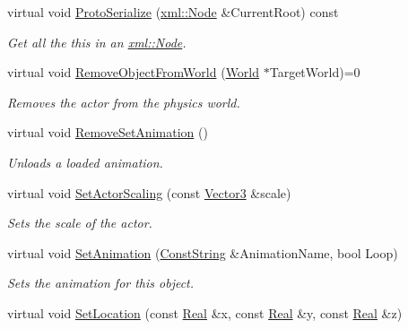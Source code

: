 \begin{DoxyCompactItemize}
virtual void \hyperlink{classphys_1_1ActorBase_a402b408b6ebb5ce82181a75dff14887f}{ProtoSerialize} (\hyperlink{classphys_1_1xml_1_1Node}{xml::Node} \&CurrentRoot) const 
\begin{DoxyCompactList}\small\item\em Get all the this in an \hyperlink{classphys_1_1xml_1_1Node}{xml::Node}. \item\end{DoxyCompactList}\item 
virtual void \hyperlink{classphys_1_1ActorBase_aaa787de7ec5d7d1d8428ea78f37bcb40}{RemoveObjectFromWorld} (\hyperlink{classphys_1_1World}{World} $\ast$TargetWorld)=0
\begin{DoxyCompactList}\small\item\em Removes the actor from the physics world. \item\end{DoxyCompactList}\item 
virtual void \hyperlink{classphys_1_1ActorBase_ac42e5e47504d7f296bb0a2bedc2ded07}{RemoveSetAnimation} ()
\begin{DoxyCompactList}\small\item\em Unloads a loaded animation. \item\end{DoxyCompactList}\item 
virtual void \hyperlink{classphys_1_1ActorBase_ac788ec31a3f70183b72b0246136bd557}{SetActorScaling} (const \hyperlink{classphys_1_1Vector3}{Vector3} \&scale)
\begin{DoxyCompactList}\small\item\em Sets the scale of the actor. \item\end{DoxyCompactList}\item 
virtual void \hyperlink{classphys_1_1ActorBase_a1c84866a23fdf7598462839dddae3240}{SetAnimation} (\hyperlink{namespacephys_a5ce5049f8b4bf88d6413c47b504ebb31}{ConstString} \&AnimationName, bool Loop)
\begin{DoxyCompactList}\small\item\em Sets the animation for this object. \item\end{DoxyCompactList}\item 
virtual void \hyperlink{classphys_1_1ActorBase_ac24dc61c6b6247305df070066f28e8d7}{SetLocation} (const \hyperlink{namespacephys_af7eb897198d265b8e868f45240230d5f}{Real} \&x, const \hyperlink{namespacephys_af7eb897198d265b8e868f45240230d5f}{Real} \&y, const \hyperlink{namespacephys_af7eb897198d265b8e868f45240230d5f}{Real} \&z)

\end{DoxyCompactItemize}
